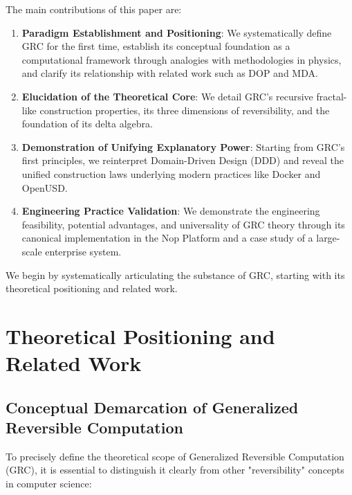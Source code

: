 \documentclass[11pt]{article}
\begin{document}
The main contributions of this paper are:
\begin{enumerate}
    \item \textbf{Paradigm Establishment and Positioning}: We systematically define GRC for the first time, establish its conceptual foundation as a computational framework through analogies with methodologies in physics, and clarify its relationship with related work such as DOP and MDA.
    \item \textbf{Elucidation of the Theoretical Core}: We detail GRC's recursive fractal-like construction properties, its three dimensions of reversibility, and the foundation of its delta algebra.
    \item \textbf{Demonstration of Unifying Explanatory Power}: Starting from GRC's first principles, we reinterpret Domain-Driven Design (DDD) and reveal the unified construction laws underlying modern practices like Docker and OpenUSD.
    \item \textbf{Engineering Practice Validation}: We demonstrate the engineering feasibility, potential advantages, and universality of GRC theory through its canonical implementation in the Nop Platform and a case study of a large-scale enterprise system.
\end{enumerate}

We begin by systematically articulating the substance of GRC, starting with its theoretical positioning and related work.

\section{Theoretical Positioning and Related Work}

\subsection{Conceptual Demarcation of Generalized Reversible Computation}
To precisely define the theoretical scope of Generalized Reversible Computation (GRC), it is essential to distinguish it clearly from other "reversibility" concepts in computer science:
\end{document}
